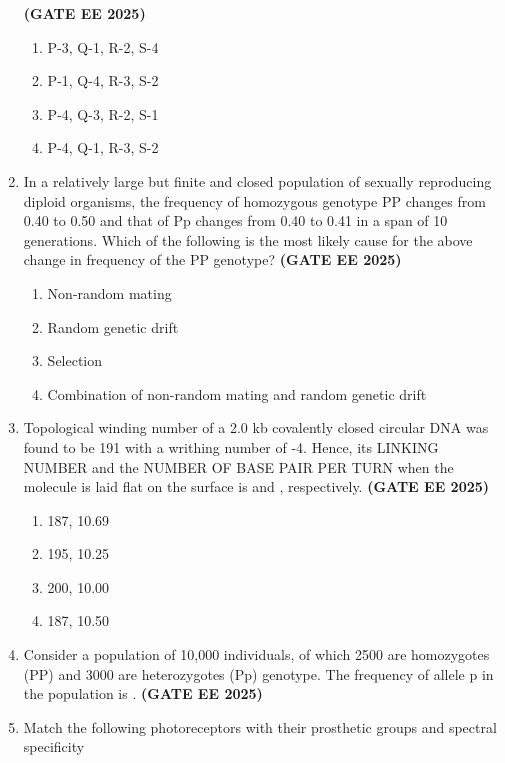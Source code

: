 \documentclass[journal,12pt,onecolumn]{IEEEtran}
\theoremstyle{remark}
\begin{document}
\begin{enumerate}
\hfill \textbf{(GATE EE 2025)}
\begin{enumerate}
\item  P-3, Q-1, R-2, S-4
\item  P-1, Q-4, R-3, S-2
\item  P-4, Q-3, R-2, S-1
\item  P-4, Q-1, R-3, S-2
\end{enumerate}

\item In a relatively large but finite and closed population of sexually reproducing diploid organisms, the frequency of homozygous genotype PP changes from 0.40 to 0.50 and that of Pp changes from 0.40 to 0.41 in a span of 10 generations. Which of the following is the most likely cause for the above change in frequency of the PP genotype? \hfill \textbf{(GATE EE 2025)}
\begin{enumerate} 
\item Non-random mating
\item Random genetic drift
\item Selection
\item Combination of non-random mating and random genetic drift
\end{enumerate}

\item Topological winding number of a 2.0 kb covalently closed circular DNA was found to be 191 with a writhing number of -4. Hence, its LINKING NUMBER and the NUMBER OF BASE PAIR PER TURN when the molecule is laid flat on the surface is \underline{\hspace{2cm}} and \underline{\hspace{2cm}}, respectively. \hfill \textbf{(GATE EE 2025)}
\begin{enumerate} 
\item 187, 10.69
\item 195, 10.25
\item 200, 10.00
\item 187, 10.50
\end{enumerate}

\item Consider a population of 10,000 individuals, of which 2500 are homozygotes (PP) and 3000 are heterozygotes (Pp) genotype. The frequency of allele p in the population is \underline{\hspace{2cm}}. \hfill \textbf{(GATE EE 2025)}

\item Match the following photoreceptors with their prosthetic groups and spectral specificity \\
\begin{tabular}{c c c}
    


\end{tabular}
\end{enumerate}
\end{document}
